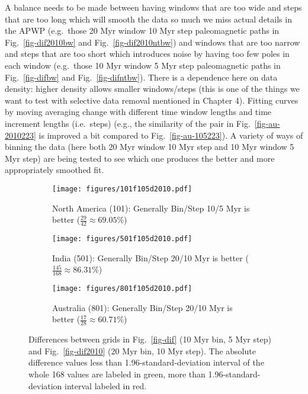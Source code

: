 A balance needs to be made between having windows that are too wide and steps
that are too long which will smooth the data so much we miss actual details in
the APWP (e.g.\ those 20 Myr window 10 Myr step paleomagnetic paths in
Fig.~\ref{fig-dif2010bw} and Fig.~\ref{fig-dif2010ntbw}) and windows that are
too narrow and steps that are too short which introduces noise by having too few
poles in each window (e.g.\ those 10 Myr window 5 Myr step paleomagnetic paths in
Fig.~\ref{fig-difbw} and Fig.~\ref{fig-difntbw}). There is a dependence here on
data density: higher density allows smaller windows/steps (this is one of the
things we want to test with selective data removal mentioned in Chapter 4).
Fitting curves by moving averaging change with different time window lengths and
time increment lengths (i.e.\ steps) (e.g., the similarity of the pair in
Fig.~\ref{fig-au-2010223} is improved a bit compared to
Fig.~\ref{fig-au-105223}). A variety of ways of binning the data (here both 20
Myr window 10 Myr step and 10 Myr window 5 Myr step) are being tested to see
which one produces the better and more appropriately smoothed fit.

\begin{figure*}
	\centering
	\begin{subfigure}{1.01\textwidth}
		\texttt{[image: figures/101f105d2010.pdf]}
		\caption{North America (101): Generally Bin/Step 10/5 Myr is better
		($\frac{29}{42}\approx69.05\%$)}\label{fig-101f105d2010}
	\end{subfigure}
	\vspace{1em}
	\begin{subfigure}{1.01\textwidth}
		\texttt{[image: figures/501f105d2010.pdf]}
		\caption{India (501): Generally Bin/Step 20/10 Myr is better
		($\frac{145}{168}\approx86.31\%$)}\label{fig-501f105d2010}
	\end{subfigure}
	\vspace{1em}
	\begin{subfigure}{1.01\textwidth}
		\texttt{[image: figures/801f105d2010.pdf]}
		\caption{Australia (801): Generally Bin/Step 20/10 Myr is better
		($\frac{17}{28}\approx60.71\%$)}\label{fig-801f105d2010}
	\end{subfigure}
	\caption[]{Differences between grids in Fig.~\ref{fig-dif} (10 Myr bin, 5
Myr step) and Fig.~\ref{fig-dif2010} (20 Myr bin, 10 Myr step). The absolute
difference values less than 1.96-standard-deviation interval of the whole 168
values are labeled in green, more than 1.96-standard-deviation interval labeled
in red.}\label{fig-f105d2010}
\end{figure*}

